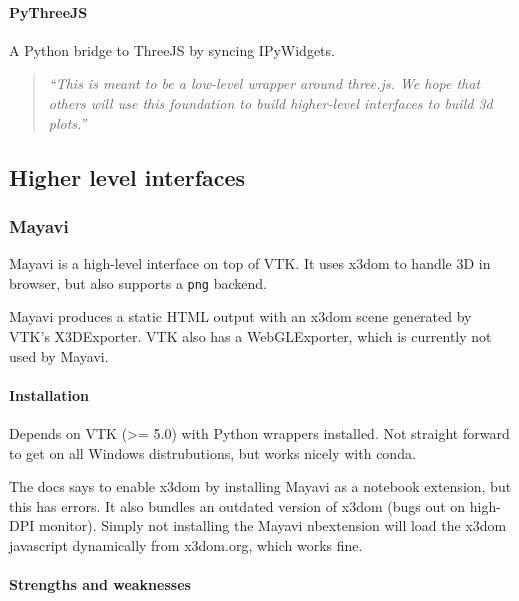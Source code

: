     \hypertarget{pythreejs}{%
\paragraph{PyThreeJS}\label{pythreejs}}

A Python bridge to ThreeJS by syncing IPyWidgets.

\begin{quote}
\emph{``This is meant to be a low-level wrapper around three.js. We hope
that others will use this foundation to build higher-level interfaces to
build 3d plots.''}
\end{quote}

    \hypertarget{higher-level-interfaces}{%
\subsection{Higher level interfaces}\label{higher-level-interfaces}}

    \hypertarget{mayavi}{%
\subsubsection{Mayavi}\label{mayavi}}

Mayavi is a high-level interface on top of VTK. It uses x3dom to handle
3D in browser, but also supports a \texttt{png} backend.

Mayavi produces a static HTML output with an x3dom scene generated by
VTK's X3DExporter. VTK also has a WebGLExporter, which is currently not
used by Mayavi.

\hypertarget{installation}{%
\paragraph{Installation}\label{installation}}

Depends on VTK (\textgreater{}= 5.0) with Python wrappers installed. Not
straight forward to get on all Windows distrubutions, but works nicely
with conda.

The docs says to enable x3dom by installing Mayavi as a notebook
extension, but this has errors. It also bundles an outdated version of
x3dom (bugs out on high-DPI monitor). Simply not installing the Mayavi
nbextension will load the x3dom javascript dynamically from x3dom.org,
which works fine.

\hypertarget{strengths-and-weaknesses}{%
\paragraph{Strengths and
weaknesses}\label{strengths-and-weaknesses}}

